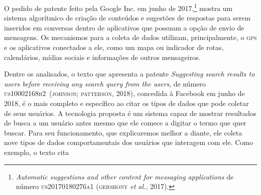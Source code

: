 O pedido de patente feito pela Google Inc. em junho de 2017,\footnote{\textit{Automatic suggestions and other content for messaging
applications} de número \textsc{us20170180276a1} (\textsc{gershony} \textit{et al.}, 2017).}
mostra um sistema algorítmico de criação de conteúdos e sugestões de
respostas para serem inseridos em conversas dentro de aplicativos que
possuam a opção de envio de mensagens. Os mecanismos para a coleta de
dados utilizam, principalmente, o \textsc{gps} e os aplicativos conectados a ele,
como um mapa ou indicador de rotas, calendários, mídias sociais e
informações de outros mensageiros.

Dentre os analisados, o texto que apresenta a patente \textit{Suggesting
search results to users before receiving any search query from the
users}, de número \textsc{us10002168b2}~(\textsc{johnson; patterson}, 2018), concedida
à Facebook em junho de 2018, é o mais completo e específico ao citar os
tipos de dados que pode coletar de seus usuários. A tecnologia proposta
é um sistema capaz de mostrar resultados de busca a um usuário antes
mesmo que ele comece a digitar o termo que quer buscar. Para seu
funcionamento, que explicaremos melhor a diante, ele coleta nove tipos
de dados comportamentais dos usuários que interagem com ele. Como
exemplo, o texto cita

